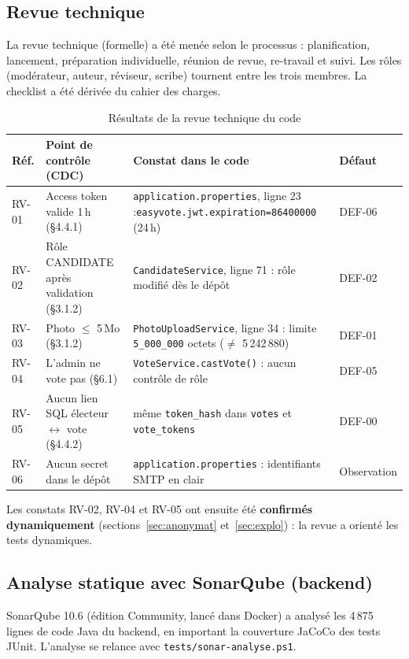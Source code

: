 \documentclass[12pt,a4paper]{report}
\begin{document}
\subsection{Revue technique}
La revue technique (formelle) a été menée selon le processus : planification, lancement, préparation individuelle, réunion de revue, re-travail et suivi. Les rôles (modérateur, auteur, réviseur, scribe) tournent entre les trois membres. La checklist a été dérivée du cahier des charges.

\begin{table}[H]
\centering
\caption{Résultats de la revue technique du code}
\small
\begin{tabularx}{\textwidth}{@{}p{1.1cm}p{4.3cm}Xp{1.8cm}@{}}
\toprule
\rowcolor{evlight}\textbf{Réf.} & \textbf{Point de contrôle (CDC)} & \textbf{Constat dans le code} & \textbf{Défaut}\\
\midrule
RV-01 & Access token valide 1\,h (§4.4.1) & \texttt{application.properties}, ligne 23 :\newline \texttt{easyvote.jwt.expiration=86400000} (24\,h) & DEF-06\\
RV-02 & Rôle CANDIDATE après validation (§3.1.2) & \texttt{CandidateService}, ligne 71 : rôle modifié dès le dépôt & DEF-02\\
RV-03 & Photo $\leq$ 5\,Mo (§3.1.2) & \texttt{PhotoUploadService}, ligne 34 : limite \texttt{5\_000\_000} octets ($\neq$ 5\,242\,880) & DEF-01\\
RV-04 & L'admin ne vote pas (§6.1) & \texttt{VoteService.castVote()} : aucun contrôle de rôle & DEF-05\\
RV-05 & Aucun lien SQL électeur $\leftrightarrow$ vote (§4.4.2) & même \texttt{token\_hash} dans \texttt{votes} et \texttt{vote\_tokens} & DEF-00\\
RV-06 & Aucun secret dans le dépôt & \texttt{application.properties} : identifiants SMTP en clair & Observation\\
\bottomrule
\end{tabularx}
\end{table}

Les constats RV-02, RV-04 et RV-05 ont ensuite été \textbf{confirmés dynamiquement} (sections~\ref{sec:anonymat} et~\ref{sec:explo}) : la revue a orienté les tests dynamiques.

\subsection{Analyse statique avec SonarQube (backend)}
SonarQube 10.6 (édition Community, lancé dans Docker) a analysé les 4\,875 lignes de code Java du backend, en important la couverture JaCoCo des tests JUnit. L'analyse se relance avec \texttt{tests/sonar-analyse.ps1}.
\end{document}
